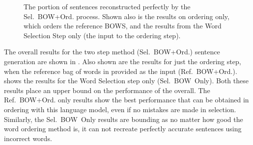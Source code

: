 \documentclass[11pt]{article}
\theoremstyle{plain}
\theoremstyle{definition}
\newcommand{\oracletitle}{Ref.~BOW+Ord.}
\newcommand{\selectiontitle}{Sel.~BOW~Only}
\newcommand{\twosteptitle}{Sel.~BOW+Ord.}
\begin{document}
\begin{table}[t]
	\centering
	\caption{The overall performance of the \twosteptitle{} sentence generation process when evaluated on the Books corpus. }
	\label{table:overall}
\end{table}


\begin{figure}
	\centering
	 {\ordlenscoresoracle}
	\caption{The portion of sentences reconstructed perfectly by the \twosteptitle{} process. Shown also is the results on ordering only, which orders the reference BOWS, and the results from the Word Selection Step only (the input to the ordering step).}
	\label{figure:exactlenscore}
\end{figure}




The overall results for the two step method (\twosteptitle{}) sentence generation are shown in . Also shown are the results for just the ordering step, when the reference bag of words in provided as the input (\oracletitle{}).  shows the results for the Word Selection step only (\selectiontitle{}). Both these results place an upper bound on the performance of the overall. The \oracletitle{} only results show the best performance that can be obtained in ordering with this language model, even if no mistakes are made in selection. Similarly, the \selectiontitle{} results are bounding as no matter how good the word ordering method is, it can not recreate perfectly accurate sentences using incorrect words.
\end{document}
